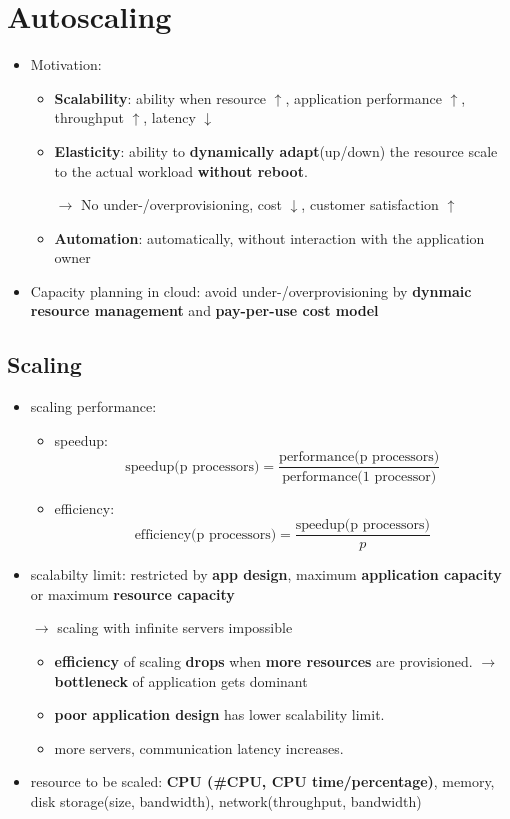 \section{Autoscaling}

\begin{itemize}
	\item Motivation:
	\begin{itemize}
		\item \textbf{Scalability}: ability when resource $\uparrow$, application performance $\uparrow$, throughput $\uparrow$, latency $\downarrow$
		\item \textbf{Elasticity}: ability to \textbf{dynamically adapt}(up/down) the resource scale to the actual workload \textbf{without reboot}. 
		
		$\rightarrow$ No under-/overprovisioning, cost $\downarrow$, customer satisfaction $\uparrow$
		\item \textbf{Automation}: automatically, without interaction with the application owner
	\end{itemize}
	\item Capacity planning in cloud: avoid under-/overprovisioning by \textbf{dynmaic resource management} and \textbf{pay-per-use cost model}
\end{itemize}

\subsection{Scaling}

\begin{itemize}
	
	\item scaling performance: 
	\begin{itemize}
		\item speedup: $$\text{speedup(p processors)} = \frac{\text{performance(p processors)}}{\text{performance(1 processor)}}$$
		\item efficiency: $$\text{efficiency(p processors)} = \frac{\text{speedup(p processors)}}{p}$$
	\end{itemize}  
	\item scalabilty limit: restricted by \textbf{app design}, maximum \textbf{application capacity} or maximum \textbf{resource capacity}
	
	$\rightarrow$ scaling with infinite servers impossible
	\begin{itemize}
		\item \textbf{efficiency} of scaling \textbf{drops} when \textbf{more resources} are provisioned. $\rightarrow$ \textbf{bottleneck} of application gets dominant
		\item \textbf{poor application design} has lower scalability limit.
		\item more servers, communication latency increases.
	\end{itemize}
	\item resource to be scaled: \textbf{CPU (\#CPU, CPU time/percentage)}, memory, disk storage(size, bandwidth), network(throughput, bandwidth)
\end{itemize}

